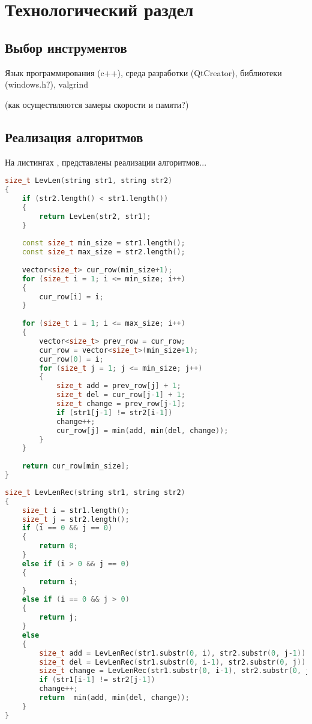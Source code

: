 \chapter{Технологический раздел}
\section{Выбор инструментов}
Язык программирования (c++), среда разработки (QtCreator), библиотеки (windows.h?), valgrind

(как осуществляются замеры скорости и памяти?)
\section{Реализация алгоритмов}
На листингах , представлены реализации алгоритмов...

\begin{lstlisting}[language=c++, caption=Реализация алгоритма Левенштейна обычным способом]
size_t LevLen(string str1, string str2)
{
	if (str2.length() < str1.length())
	{
		return LevLen(str2, str1);
	}
	
	const size_t min_size = str1.length();
	const size_t max_size = str2.length();
	
	vector<size_t> cur_row(min_size+1);
	for (size_t i = 1; i <= min_size; i++)
	{
		cur_row[i] = i;
	}
	
	for (size_t i = 1; i <= max_size; i++)
	{
		vector<size_t> prev_row = cur_row;
		cur_row = vector<size_t>(min_size+1);
		cur_row[0] = i;
		for (size_t j = 1; j <= min_size; j++)
		{
			size_t add = prev_row[j] + 1;
			size_t del = cur_row[j-1] + 1;
			size_t change = prev_row[j-1];
			if (str1[j-1] != str2[i-1])
			change++;
			cur_row[j] = min(add, min(del, change));
		}
	}
	
	return cur_row[min_size];
}
\end{lstlisting}


\begin{lstlisting}[language=c++, caption=Реализация алгоритма Левенштейна рекусрсивным способом]
size_t LevLenRec(string str1, string str2)
{
	size_t i = str1.length();
	size_t j = str2.length();
	if (i == 0 && j == 0)
	{
		return 0;
	}
	else if (i > 0 && j == 0)
	{
		return i;
	}
	else if (i == 0 && j > 0)
	{
		return j;
	}
	else
	{
		size_t add = LevLenRec(str1.substr(0, i), str2.substr(0, j-1)) + 1;
		size_t del = LevLenRec(str1.substr(0, i-1), str2.substr(0, j)) + 1;
		size_t change = LevLenRec(str1.substr(0, i-1), str2.substr(0, j-1));
		if (str1[i-1] != str2[j-1])
		change++;
		return  min(add, min(del, change));
	}
}
\end{lstlisting}

